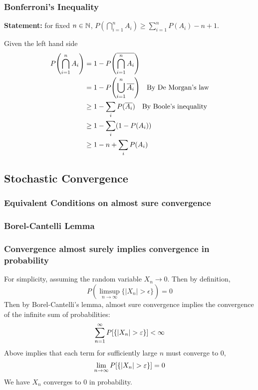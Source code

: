 \begin{prf}
\subsubsection{Bonferroni's Inequality}
\label{proof: bonferroni}
\textbf{Statement: }for fixed $n\in \mathbb{N}$,  $P(\bigcap_{i=1}^nA_i)\geq \sum_{i=1}^n P(A_i)-n+1$.

\begin{prf*}
	Given the left hand side
	\begin{align*}
		P\qty(\bigcap_{i=1}^nA_i) &= 1-P\qty(\overline{\bigcap_{i=1}^nA_i})\\
		&= 1 - P\qty(\bigcup_{i=1}^n \overline{A_i}) \quad \text{By De Morgan's law}\\
		&\geq 1-\sum_i P(\overline{A_i}) \quad\text{By Boole's inequality}\\
		&\geq 1 - \sum_i (1-P(A_i))\\
		&\geq 1 - n + \sum_i P(A_i)
	\end{align*}
\end{prf*}


\subsection{Stochastic Convergence}

\subsubsection{Equivalent Conditions on almost sure convergence}

\subsubsection{Borel-Cantelli Lemma}

\subsubsection{Convergence almost surely implies convergence in probability}
\label{proof: a.s.convergence implies convergence in prob}
\begin{prf*}
	For simplicity, assuming the random variable $X_n\rightarrow 0$. Then by definition, 
	$$P\left( \limsup_{n \to \infty} \{|X_n| > \epsilon\} \right) = 0$$
	Then by Borel-Cantelli's lemma, almost sure convergence implies the convergence of the infinite sum of probabilities: 
	$$\sum_{n=1}^\infty P\qty[\{|X_n| > \varepsilon\}] < \infty$$
	Above implies that each term for sufficiently large $n$ must converge to 0,	
	$$\lim_{n\to\infty} P\qty[\{|X_n| > \varepsilon\}] = 0$$
	We have $X_n$ converges to 0 in probability. 
\end{prf*}


\end{prf}
